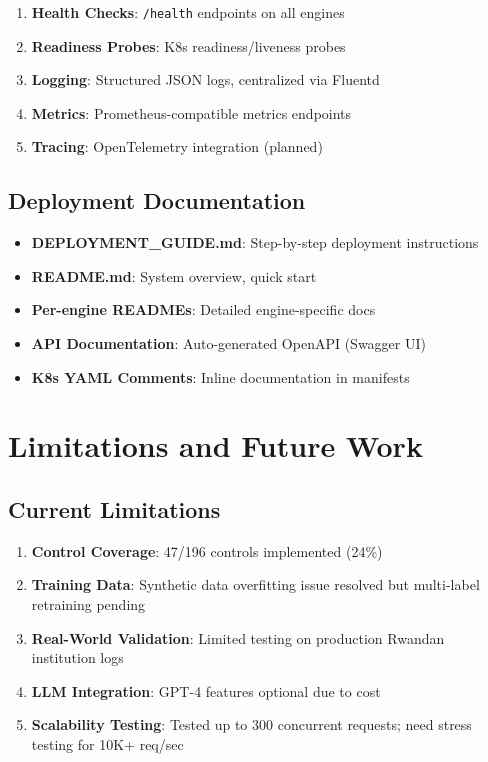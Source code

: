 \documentclass[11pt,conference]{IEEEtran}
\begin{document}
\begin{enumerate}
    \item \textbf{Health Checks}: \texttt{/health} endpoints on all engines
    \item \textbf{Readiness Probes}: K8s readiness/liveness probes
    \item \textbf{Logging}: Structured JSON logs, centralized via Fluentd
    \item \textbf{Metrics}: Prometheus-compatible metrics endpoints
    \item \textbf{Tracing}: OpenTelemetry integration (planned)
\end{enumerate}

\subsection{Deployment Documentation}

\begin{itemize}
    \item \textbf{DEPLOYMENT\_GUIDE.md}: Step-by-step deployment instructions
    \item \textbf{README.md}: System overview, quick start
    \item \textbf{Per-engine READMEs}: Detailed engine-specific docs
    \item \textbf{API Documentation}: Auto-generated OpenAPI (Swagger UI)
    \item \textbf{K8s YAML Comments}: Inline documentation in manifests
\end{itemize}

\section{Limitations and Future Work}

\subsection{Current Limitations}

\begin{enumerate}
    \item \textbf{Control Coverage}: 47/196 controls implemented (24\%)
    \item \textbf{Training Data}: Synthetic data overfitting issue resolved but multi-label retraining pending
    \item \textbf{Real-World Validation}: Limited testing on production Rwandan institution logs
    \item \textbf{LLM Integration}: GPT-4 features optional due to cost
    \item \textbf{Scalability Testing}: Tested up to 300 concurrent requests; need stress testing for 10K+ req/sec
\end{enumerate}
\end{document}
